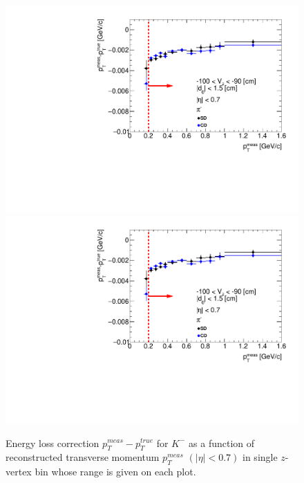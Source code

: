 \begin{figure}[hb]
\caption[Energy loss correction for $K^-$ as a function of reconstructed transverse momentum $p_T^{meas}$.]{Energy loss correction $p_T^{meas}-p_T^{true}$ for $K^-$ as a function of reconstructed transverse momentum $p_T^{meas}$ $\left(|\eta|<0.7\right)$ in single $z$-vertex bin whose range is given on each plot.}\label{fig:energyLossPrimaryK_minus}
\centering
\parbox{0.329\textwidth}{
  \centering
  \includegraphics[width=\linewidth,page=23]{graphics/energyLoss/energyLoss3D_OnePrtAlso.pdf}\\
  \includegraphics[width=\linewidth,page=26]{graphics/energyLoss/energyLoss3D_OnePrtAlso.pdf}\\
}
\end{figure}
